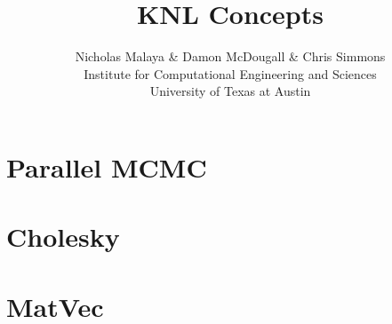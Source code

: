 \documentclass{article}
\title{\bf{KNL Concepts}}
\author{Nicholas Malaya \& Damon McDougall \& Chris Simmons \\ Institute for Computational Engineering and Sciences \\ University of Texas at Austin} \date{}
\begin{document}
\maketitle

\newpage

\section{Parallel MCMC}

\section{Cholesky}

\section{MatVec}
\end{document}
